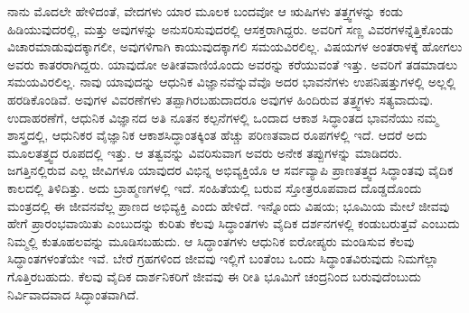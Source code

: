 \vskip 0.2cm

ನಾನು ಮೊದಲೇ ಹೇಳಿದಂತೆ, ವೇದಗಳು ಯಾರ ಮೂಲಕ ಬಂದವೋ ಆ ಋಷಿಗಳು ತತ್ತ್ವಗಳನ್ನು ಕಂಡು ಹಿಡಿಯುವುದರಲ್ಲಿ, ಮತ್ತು ಅವುಗಳನ್ನು ಅನುಸರಿಸುವುದರಲ್ಲಿ ಆಸಕ್ತರಾಗಿದ್ದರು. ಅವರಿಗೆ ಸಣ್ಣ ವಿವರಗಳನ್ನೆತ್ತಿಕೊಂಡು ವಿಚಾರಮಾಡುವುದಕ್ಕಾಗಲೀ, ಅವುಗಳಿಗಾಗಿ ಕಾಯುವುದಕ್ಕಾಗಲಿ ಸಮಯವಿರಲಿಲ್ಲ. ವಿಷಯಗಳ ಅಂತರಾಳಕ್ಕೆ ಹೋಗಲು ಅವರು ಕಾತರರಾಗಿದ್ದರು. ಯಾವುದೋ ಅತೀತವಾಣಿಯೊಂದು ಅವರನ್ನು ಕರೆಯುವಂತೆ ಇತ್ತು. ಅವರಿಗೆ ತಡಮಾಡಲು ಸಮಯವಿರಲಿಲ್ಲ. ನಾವು ಯಾವುದನ್ನು ಆಧುನಿಕ ವಿಜ್ಞಾನವೆನ್ನುವೆವೊ ಅದರ ಭಾವನೆಗಳು ಉಪನಿಷತ್ತುಗಳಲ್ಲಿ ಅಲ್ಲಲ್ಲಿ ಹರಡಿಕೊಂಡಿವೆ. ಅವುಗಳ ವಿವರಣೆಗಳು ತಪ್ಪಾಗಿರಬಹುದಾದರೂ ಅವುಗಳ ಹಿಂದಿರುವ ತತ್ತ್ವಗಳು ಸತ್ಯವಾದುವು. ಉದಾಹರಣೆಗೆ, ಆಧುನಿಕ ವಿಜ್ಞಾನದ ಅತಿ ನೂತನ ಕಲ್ಪನೆಗಳಲ್ಲಿ ಒಂದಾದ ಆಕಾಶ ಸಿದ್ಧಾಂತದ ಭಾವನೆಯು ನಮ್ಮ ಶಾಸ್ತ್ರದಲ್ಲಿ, ಆಧುನಿಕರ ವೈಜ್ಞಾನಿಕ ಆಕಾಶಸಿದ್ಧಾಂತಕ್ಕಿಂತ ಹೆಚ್ಚು ಪರಿಣತವಾದ ರೂಪಗಳಲ್ಲಿ ಇದೆ. ಆದರೆ ಅದು ಮೂಲತತ್ತ್ವದ ರೂಪದಲ್ಲಿ ಇತ್ತು. ಆ ತತ್ವವನ್ನು ವಿವರಿಸುವಾಗ ಅವರು ಅನೇಕ ತಪ್ಪುಗಳನ್ನು ಮಾಡಿದರು. ಜಗತ್ತಿನಲ್ಲಿರುವ ಎಲ್ಲ ಜೀವಿಗಳೂ ಯಾವುದರ ವಿಭಿನ್ನ ಅಭಿವ್ಯಕ್ತಿಯೊ ಆ ಸರ್ವವ್ಯಾಪಿ ಪ್ರಾಣತತ್ತ್ವದ ಸಿದ್ಧಾಂತವು ವೈದಿಕ ಕಾಲದಲ್ಲಿ ತಿಳಿದಿತ್ತು. ಅದು ಬ್ರಾಹ್ಮಣಗಳಲ್ಲಿ ಇದೆ. ಸಂಹಿತೆಯಲ್ಲಿ ಬರುವ ಸ್ತೋತ್ರರೂಪವಾದ ದೊಡ್ಡದೊಂದು ಮಂತ್ರದಲ್ಲಿ ಈ ಜೀವನವೆಲ್ಲ ಪ್ರಾಣದ ಅಭಿವ್ಯಕ್ತಿ ಎಂದು ಹೇಳಿದೆ. ಇನ್ನೊಂದು ವಿಷಯ; ಭೂಮಿಯ ಮೇಲೆ ಜೀವವು ಹೇಗೆ ಪ್ರಾರಂಭವಾಯಿತು ಎಂಬುದನ್ನು ಕುರಿತು ಕೆಲವು ಸಿದ್ಧಾಂತಗಳು ವೈದಿಕ ದರ್ಶನಗಳಲ್ಲಿ ಕಂಡುಬರುತ್ತವೆ ಎಂಬುದು ನಿಮ್ಮಲ್ಲಿ ಕುತೂಹಲವನ್ನು ಮೂಡಿಸಬಹುದು. ಆ ಸಿದ್ಧಾಂತಗಳು ಆಧುನಿಕ ಐರೋಪ್ಯರು ಮಂಡಿಸುವ ಕೆಲವು ಸಿದ್ಧಾಂತಗಳಂತೆಯೇ ಇವೆ. ಬೇರೆ ಗ್ರಹಗಳಿಂದ ಜೀವವು ಇಲ್ಲಿಗೆ ಬಂತೆಂಬ ಒಂದು ಸಿದ್ಥಾಂತವಿರುವುದು ನಿಮಗೆಲ್ಲಾ ಗೊತ್ತಿರಬಹುದು. ಕೆಲವು ವೈದಿಕ ದಾರ್ಶನಿಕರಿಗೆ ಜೀವವು ಈ ರೀತಿ ಭೂಮಿಗೆ ಚಂದ್ರನಿಂದ ಬರುವುದೆಂಬುದು ನಿರ್ವಿವಾದವಾದ ಸಿದ್ಧಾಂತವಾಗಿದೆ.

\vskip 0.2cm

